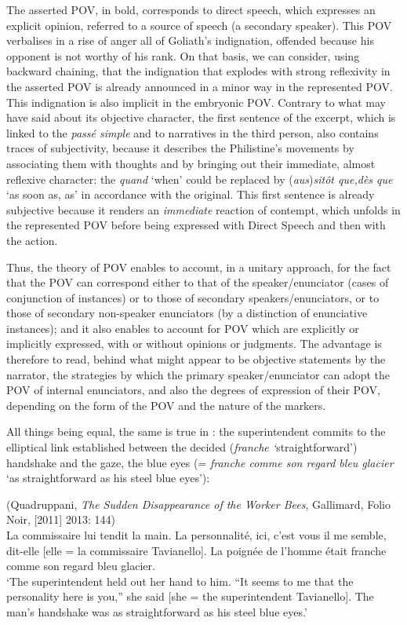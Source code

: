 \documentclass[output=paper]{langscibook}
\begin{document}
The asserted POV, in bold, corresponds to direct speech, which expresses an explicit opinion, referred to a source of speech (a secondary speaker). This POV verbalises in a rise of anger all of Goliath's indignation, offended because his opponent is not worthy of his rank. On that basis, we can consider, using backward chaining, that the indignation that explodes with strong reflexivity in the asserted POV is already announced in a minor way in the represented POV. This indignation is also implicit in the embryonic POV. Contrary to what \citet[240--241]{Benveniste1966} may have said about its objective character, the first sentence of the excerpt, which is linked to the \textit{passé simple} {and to narratives in the third person, also contains traces of subjectivity, because it describes the Philistine’s movements by associating them with thoughts and by bringing out their immediate, almost reflexive character: the} \textit{quand} ‘when’ could be replaced by ({\textit{aus}})\textit{sitôt que,}\textit{dès que} ‘as soon as, as’ in accordance with the original. This first sentence is already subjective because it renders an \textit{immediate} reaction of contempt, which unfolds in the represented POV before being expressed with Direct Speech and then with the action.

Thus, the theory of POV enables to account, in a unitary approach, for the fact that the POV can correspond either to that of the speaker/enunciator (cases of conjunction of instances) or to those of secondary speakers/enunciators, or to those of secondary non-speaker enunciators (by a distinction of enunciative instances); and it also enables to account for POV which are explicitly or implicitly expressed, with or without opinions or judgments. The advantage is therefore to read, behind what might appear to be objective statements by the narrator, the strategies by which the primary speaker/enunciator can adopt the POV of internal enunciators, and also the degrees of expression of their POV, depending on the form of the POV and the nature of the markers.

All things being equal, the same is true in : the superintendent commits to the elliptical link established between the decided (\textit{franche ‘}straightforward’) handshake and the gaze, the blue eyes (= \textit{franche comme son regard bleu glacier} ‘as straightforward as his steel blue eyes’):



\ea (Quadruppani, \textit{The Sudden Disappearance of the Worker Bees}, Gallimard, Folio Noir, [2011] 2013: 144)\label{ex:06:2}\\
La commissaire lui tendit la main. La personnalité, ici, c’est vous il me semble, dit-elle [elle = la commissaire Tavianello]. La poignée de l’homme était franche comme son regard bleu glacier.\\
\glt `The superintendent held out her hand to him. “It seems to me that the personality here  is you,” she said [she = the superintendent Tavianello]. The man's handshake was as straightforward as his steel blue eyes.'
\z 
\end{document}

